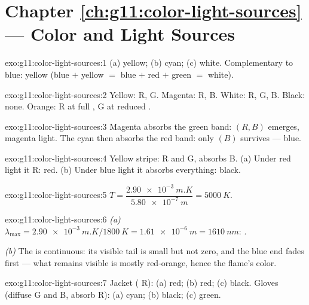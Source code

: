 \section*{Chapter \ref{ch:g11:color-light-sources} --- Color and Light Sources}

\begin{solution}{exo:g11:color-light-sources:1}
(a) yellow; (b) cyan; (c) white. Complementary to blue: yellow
(blue $+$ yellow $=$ blue $+$ red $+$ green $=$ white).
\end{solution}

\begin{solution}{exo:g11:color-light-sources:2}
Yellow: R, G. Magenta: R, B. White: R, G, B. Black: none. Orange: R at
full , G at reduced .
\end{solution}

\begin{solution}{exo:g11:color-light-sources:3}
Magenta absorbs the green band: $(R, B)$ emerges, magenta light. The
cyan  then absorbs the red band: only $(B)$ survives --- blue.
\end{solution}

\begin{solution}{exo:g11:color-light-sources:4}
Yellow stripe:  R and G, absorbs B. (a) Under red light it
 R: red. (b) Under blue light it absorbs everything: black.
\end{solution}

\begin{solution}{exo:g11:color-light-sources:5}
$T = \dfrac{\qty{2.90e-3}{m.K}}{\qty{5.80e-7}{m}} = \qty{5000}{K}$.
\end{solution}

\begin{solution}{exo:g11:color-light-sources:6}
\emph{(a)} $\lambda_{\max} = \qty{2.90e-3}{m.K}/\qty{1800}{K}
= \qty{1.61e-6}{m} = \qty{1610}{nm}$: .

\emph{(b)} The  is continuous: its visible tail is small but not
zero, and the blue end fades first --- what remains visible is mostly
red-orange, hence the flame's color.
\end{solution}

\begin{solution}{exo:g11:color-light-sources:7}
Jacket ( R): (a) red; (b) red; (c) black. Gloves (diffuse G and
B, absorb R): (a) cyan; (b) black; (c) green.
\end{solution}

